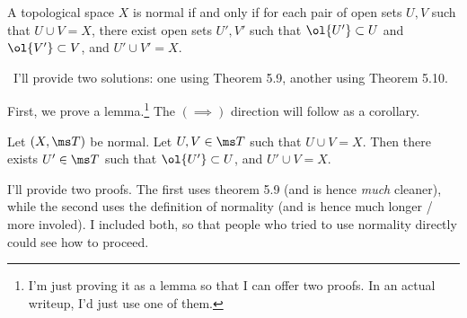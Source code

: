 \documentclass{fkpset}
\begin{document}

  \begin{problem}
    A topological space $X$ is normal if and only if for each pair of
    open sets $U,V$ such that $U \cup V = X$, there exist open sets
    $U', V'$ such that $\ol{U'} \subset U$ and $\ol{V'} \subset V$,
    and $U' \cup V' = X$.
  \end{problem}
  \quad\
  I'll provide two solutions: one using Theorem 5.9, another using
  Theorem 5.10.
  \begin{solution}[Solution 1:]
    First, we prove a lemma.\footnote{I'm just proving it as a lemma
      so that I can offer two proofs. In an actual writeup, I'd just
      use one of them.} The $(\implies)$ direction will follow as a
    corollary.
    \begin{leftbar}\setcounter{section}{2}\vspace{-.25cm}
      \begin{lemma}
        Let $(X, \ms T)$ be normal. Let $U,V \in \ms T$ such that $U
        \cup V = X$. Then there exists $U' \in \ms T$ such that
        $\ol{U'} \subset U$, and $U' \cup V = X$.
      \end{lemma}

      I'll provide two proofs. The first uses theorem 5.9 (and is
      hence \emph{much} cleaner), while the second uses the definition
      of normality (and is hence much longer / more involed). I
      included both, so that people who tried to use normality
      directly could see how to proceed.


\end{leftbar}
\end{solution}
\end{document}
